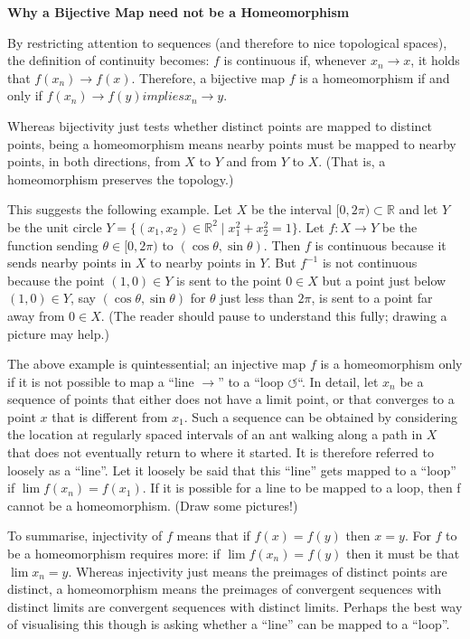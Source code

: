 \documentclass[a4paper,11pt]{article}
\begin{document}
\textbf{Why a Bijective Map need not be a Homeomorphism}

By restricting attention to sequences (and therefore to nice
topological spaces), the definition of continuity becomes: $f$ is
continuous if, whenever $x_n \rightarrow x$, it holds that $f(x_n)
\rightarrow f(x)$. Therefore, a bijective map $f$ is a homeomorphism
if and only if $f(x_n) \rightarrow f(y) implies x_n \rightarrow y$.

Whereas bijectivity just tests whether distinct points are mapped to
distinct points, being a homeomorphism means nearby points must be
mapped to nearby points, in both directions, from $X$ to $Y$ and from
$Y$ to $X$. (That is, a homeomorphism preserves the topology.)

This suggests the following example. Let $X$ be the interval $[0,2\pi)
\subset \mathbb{R}$ and let $Y$ be the unit circle $Y = \{ (x_1,x_2)
\in \mathbb{R}^2 \mid x_1^2 + x_2^2 = 1\}$. Let $f\colon X \rightarrow
Y$ be the function sending $\theta \in [0,2\pi)$ to
$(\cos\theta,\sin\theta)$. Then $f$ is continuous because it sends
nearby points in $X$ to nearby points in $Y$. But $f^{-1}$ is not
continuous because the point $(1,0) \in Y$ is sent to the point $0 \in
X$ but a point just below $(1,0) \in Y$, say $(\cos\theta,\sin\theta)$
for $\theta$ just less than $2\pi$, is sent to a point far away from
$0 \in X$. (The reader should pause to understand this fully; drawing
a picture may help.)

The above example is quintessential; an injective map $f$ is a
homeomorphism only if it is not possible to map a ``line
$\longrightarrow$'' to a ``loop $\circlearrowleft$``. In detail, let
$x_n$ be a sequence of points that either does not have a limit point,
or that converges to a point $x$ that is different from $x_1$. Such a
sequence can be obtained by considering the location at regularly
spaced intervals of an ant walking along a path in $X$ that does not
eventually return to where it started. It is therefore referred to
loosely as a ``line''. Let it loosely be said that this ``line'' gets
mapped to a ``loop'' if $\lim f(x_n) = f(x_1)$. If it is possible for
a line to be mapped to a loop, then f cannot be a homeomorphism. (Draw
some pictures!)

To summarise, injectivity of $f$ means that if $f(x) = f(y)$ then  $x
= y$. For $f$ to be a homeomorphism requires more: if $\lim f(x_n) =
f(y)$ then it must be that $\lim x_n = y$. Whereas injectivity just
means the preimages of distinct points are distinct, a homeomorphism
means the preimages of  convergent sequences with distinct limits are
convergent sequences with distinct limits. Perhaps the best way of
visualising this though is asking whether a ``line'' can be mapped to
a ``loop''.
\end{document}
